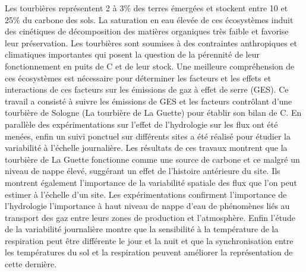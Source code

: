 {\begin{framed}
	\begin{minipage}{\dimexpr\textwidth-2\fboxrule-2\fboxsep}
	Les tourbières représentent 2 à 3\% des terres émergées et stockent entre 10 et 25\% du carbone des sols. La saturation en eau élevée de ces écosystèmes induit des cinétiques de décomposition des matières organiques très faible et favorise leur préservation. Les tourbières sont soumises à des contraintes anthropiques et climatiques importantes qui posent la question de la pérennité de leur fonctionnement en puits de C et de leur stock. Une meilleure compréhension de ces écosystèmes est nécessaire pour déterminer les facteurs et les effets et interactions de ces facteurs sur les émissions de gaz à effet de serre (GES).
	Ce travail a consisté à suivre les émissions de GES et les facteurs contrôlant d'une tourbière de Sologne (La tourbière de La Guette) pour établir son bilan de C. En parallèle des expérimentations sur l'effet de l'hydrologie sur les flux ont été menées, enfin un suivi ponctuel sur différents sites a été réalisé pour étudier la variabilité à l'échelle journalière.
	Les résultats de ces travaux montrent que la tourbière de La Guette fonctionne comme une source de carbone et ce malgré un niveau de nappe élevé, suggérant un effet de l'histoire antérieure du site. Ils montrent également l'importance de la variabilité spatiale des flux que l'on peut estimer à l'échelle d'un site. Les expérimentations confirment l'importance de l'hydrologie l'importance à haut niveau de nappe d'eau de phénomènes liés au transport des gaz entre leurs zones de production et l'atmosphère. Enfin l'étude de la variabilité journalière montre que la sensibilité à la température de la respiration peut être différente le jour et la nuit et que la synchronisation entre les températures du sol et la respiration peuvent améliorer la représentation de cette dernière.

\end{minipage}
\end{framed}}
